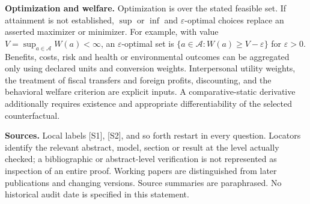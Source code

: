 \documentclass[11pt,a4paper]{article}
\begin{document}
\textbf{Optimization and welfare.} Optimization is over the stated feasible set. If attainment is not established, $\sup$ or $\inf$ and $\varepsilon$-optimal choices replace an asserted maximizer or minimizer. For example, with value $V=\sup_{a\in\mathcal A}W(a)<\infty$, an $\varepsilon$-optimal set is $\{a\in\mathcal A:W(a)\geq V-\varepsilon\}$ for $\varepsilon>0$. Benefits, costs, risk and health or environmental outcomes can be aggregated only using declared units and conversion weights. Interpersonal utility weights, the treatment of fiscal transfers and foreign profits, discounting, and the behavioral welfare criterion are explicit inputs. A comparative-static derivative additionally requires existence and appropriate differentiability of the selected counterfactual.

\textbf{Sources.} Local labels [S1], [S2], and so forth restart in every question. Locators identify the relevant abstract, model, section or result at the level actually checked; a bibliographic or abstract-level verification is not represented as inspection of an entire proof. Working papers are distinguished from later publications and changing versions. Source summaries are paraphrased. No historical audit date is specified in this statement.
\end{document}
